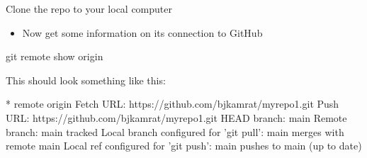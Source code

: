 \documentclass[
  ignorenonframetext,
]{beamer}
\newenvironment{Shaded}{\begin{snugshade}}{\end{snugshade}}
\newcommand{\ExtensionTok}[1]{#1}
\newcommand{\FunctionTok}[1]{\textcolor[rgb]{0.00,0.00,0.00}{#1}}
\newcommand{\NormalTok}[1]{#1}
\newcommand{\StringTok}[1]{\textcolor[rgb]{0.31,0.60,0.02}{#1}}
\providecommand{\tightlist}{%
  \setlength{\itemsep}{0pt}\setlength{\parskip}{0pt}}
\begin{document}
\begin{frame}[fragile]{Clone the repo to your local computer}
\protect\hypertarget{clone-the-repo-to-your-local-computer-4}{}

\begin{itemize}
\tightlist
\item
  Now get some information on its connection to GitHub
\end{itemize}

\begin{Shaded}
\begin{Highlighting}[]
\FunctionTok{git}\NormalTok{ remote show origin}
\end{Highlighting}
\end{Shaded}

This should look something like this:

\begin{Shaded}
\begin{Highlighting}[]
\ExtensionTok{*}\NormalTok{ remote origin}
  \ExtensionTok{Fetch}\NormalTok{ URL: https://github.com/bjkamrat/myrepo1.git}
  \ExtensionTok{Push}\NormalTok{  URL: https://github.com/bjkamrat/myrepo1.git}
  \ExtensionTok{HEAD}\NormalTok{ branch: main}
  \ExtensionTok{Remote}\NormalTok{ branch:}
    \ExtensionTok{main}\NormalTok{ tracked}
  \ExtensionTok{Local}\NormalTok{ branch configured for }\StringTok{'git pull'}\NormalTok{:}
    \ExtensionTok{main}\NormalTok{ merges with remote main}
  \ExtensionTok{Local}\NormalTok{ ref configured for }\StringTok{'git push'}\NormalTok{:}
    \ExtensionTok{main}\NormalTok{ pushes to main (up to date)}
\end{Highlighting}
\end{Shaded}

\end{frame}
\end{document}
